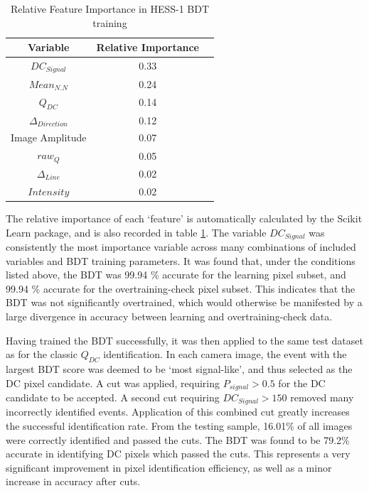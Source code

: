 \documentclass[11pt]{article}
\begin{document}
\begin{table}[h!]
  \centering
  \caption{Relative Feature Importance in HESS-1 BDT training}
  \label{tab:hess1classifier}
  \begin{tabular}{ccc}
    \toprule
    Variable & Relative Importance\\
    \midrule
    $DC_{Signal}$ & 0.33\\
    $Mean_{N.N}$ & 0.24\\
    $Q_{DC}$ & 0.14\\
    $\Delta_{Direction}$ & 0.12\\
    Image Amplitude & 0.07\\
    $raw_{Q}$ & 0.05\\
    $\Delta_{Line}$ & 0.02\\
    $Intensity$ & 0.02\\
    \bottomrule
  \end{tabular}
\end{table}

The relative importance of each \textquoteleft feature' is automatically calculated by the Scikit Learn package, and is also recorded in table \ref{tab:hess1classifier}. The variable $DC_{Signal}$ was consistently the most importance variable across many combinations of included variables and BDT training parameters. It was found that, under the conditions listed above, the BDT was 99.94 \% accurate for the learning pixel subset, and 99.94 \%  accurate for the overtraining-check pixel subset. This indicates that the BDT was not significantly overtrained, which would otherwise be manifested by a large divergence in accuracy between learning and overtraining-check data.

Having trained the BDT successfully, it was then applied to the same test dataset as for the classic $Q_{DC}$ identification. In each camera image, the event with the largest BDT score was deemed to be \textquoteleft most signal-like', and thus selected as the DC pixel candidate. A cut was applied, requiring $P_{signal} > 0.5$ for the DC candidate to be accepted. A second cut requiring $DC_{Signal} > 150$ removed many incorrectly identified events. Application of this combined cut greatly increases the successful identification rate. From the testing sample, 16.01\% of all images were correctly identified and passed the cuts. The BDT was found to be 79.2\% accurate in identifying DC pixels which passed the cuts. This represents a very significant improvement in pixel identification efficiency, as well as a minor increase in accuracy after cuts. 
\end{document}
